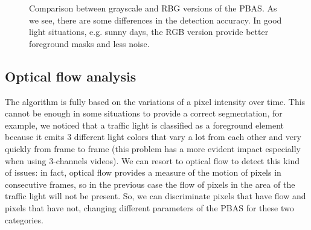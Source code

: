 \begin{figure}[!t]
    \centering
    \newline
    \newline
    \caption{Comparison between grayscale and RBG versions of the PBAS. As we see, there are some differences in the detection accuracy. In good light situations, e.g. sunny days, the RGB version provide better foreground masks and less noise.}
\end{figure}

\subsection*{Optical flow analysis}
The algorithm is fully based on the variations of a pixel intensity over time. This cannot be enough in some situations to provide a correct segmentation, for example, we noticed that a traffic light is classified as a foreground element because it emits 3 different light colors that vary a lot from each other and very quickly from frame to frame (this problem has a more evident impact especially when using 3-channels videos). We can resort to optical flow to detect this kind of issues: in fact, optical flow provides a measure of the motion of pixels in consecutive frames, so in the previous case the flow of pixels in the area of the traffic light will not be present. So, we can discriminate pixels that have flow and pixels that have not, changing different parameters of the PBAS for these two categories.

